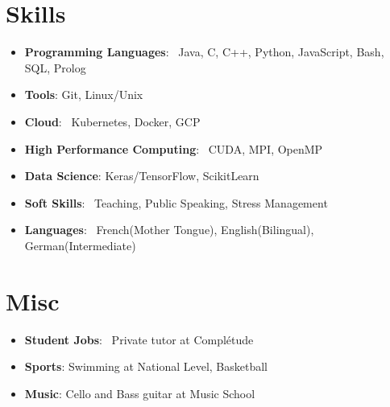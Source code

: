 \documentclass[a4paper,20pt]{article}
\newcommand{\resumeItem}[2]{
  \item\small{
    \textbf{#1}{: #2 \vspace{-2pt}}
  }
}
\newcommand{\resumeSubItem}[2]{\resumeItem{#1}{#2}\vspace{-3pt}}
\newcommand{\resumeSubHeadingListStart}{\begin{itemize}[leftmargin=*]}
\newcommand{\resumeSubHeadingListEnd}{\end{itemize}}
\begin{document}
\vspace{5pt}

\section{Skills}
 \resumeSubHeadingListStart
  \resumeSubItem{Programming Languages}{~Java, C, C++, Python, JavaScript, Bash, SQL, Prolog}
  \resumeSubItem{Tools}{Git, Linux/Unix}
  \resumeSubItem{Cloud}{~Kubernetes, Docker, GCP}
  \resumeSubItem{High Performance Computing}{~CUDA, MPI, OpenMP}
  \resumeSubItem{Data Science}{Keras/TensorFlow, ScikitLearn}

  \resumeSubItem{Soft Skills}{~Teaching, Public Speaking, Stress Management}
  \resumeSubItem{Languages}{~French(Mother Tongue), English(Bilingual), German(Intermediate)}
 \resumeSubHeadingListEnd

\vspace{5pt}

\section{Misc}
 \resumeSubHeadingListStart
  \resumeSubItem{Student Jobs}{~Private tutor at Complétude}
  \resumeSubItem{Sports}{Swimming at National Level, Basketball}
  \resumeSubItem{Music}{Cello and Bass guitar at Music School}
 \resumeSubHeadingListEnd
\end{document}
